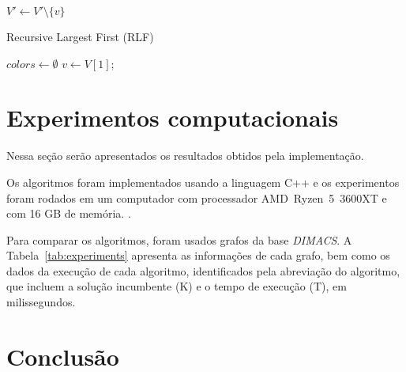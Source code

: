 \documentclass[10pt]{article}
\begin{document}
\begin{multicols*}{2}
\begin{algorithm}[H]
{    $V' \gets V' \setminus \{v\}$\;
}
\;

\end{algorithm}



\begin{algorithm}[H]
\caption{Recursive Largest First (RLF)}
\label{alg:rlf}


$colors \gets \emptyset$\;
$v \gets V[1]$;

\end{algorithm}


\section{Experimentos computacionais}
Nessa seção serão apresentados os resultados obtidos pela implementação.

Os algoritmos foram implementados usando a linguagem C++ e os experimentos foram
rodados em um computador com processador AMD~Ryzen~5~3600XT e com 16 GB de memória.
.

Para comparar os algoritmos, foram usados grafos da base \emph{DIMACS}.
A Tabela~\ref{tab:experiments} apresenta as informações de cada grafo, bem como
os dados da execução de cada algoritmo, identificados pela abreviação do 
algoritmo, que incluem a solução incumbente (K) e o tempo de execução (T), em
milissegundos.

\section{Conclusão}

\end{multicols*}
\end{document}
